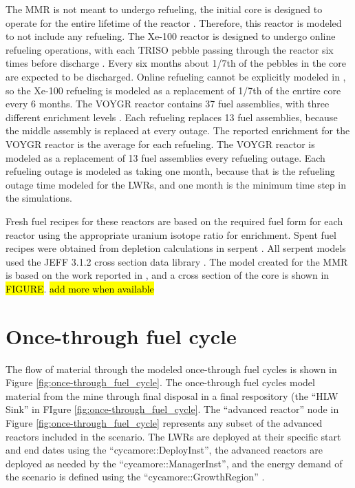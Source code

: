 The \gls{MMR} is not meant to undergo refueling, the initial core is designed 
to operate for the entire lifetime of the reactor \cite{mitchell_usnc_2020}. 
Therefore, this reactor 
is modeled to not include any refueling. The Xe-100 reactor is designed to 
undergo online refueling operations, with each \gls{TRISO} pebble passing 
through the reactor six times before discharge \cite{hussain_advances_2018}. 
Every six months about 1/7th 
of the pebbles in the core are expected to be discharged. Online refueling 
cannot be explicitly modeled in \Cyclus, so the Xe-100 refueling is modeled 
as a replacement of 1/7th of the enrtire core every 6 months. 
The VOYGR reactor contains 37 fuel assemblies, with three different enrichment 
levels \cite{nuscale_chapter_2020}. Each refueling replaces 13 fuel assemblies, 
because the middle assembly is replaced at every outage. The reported enrichment 
for the VOYGR reactor is the average for each refueling. The VOYGR reactor is 
modeled as a replacement of 13 fuel assemblies every refueling outage. Each refueling 
outage is modeled as taking one month, because that is the refueling outage time 
modeled for the \glspl{LWR}, and one month is the minimum time step in the 
simulations. 

Fresh fuel recipes for these reactors are based on the required fuel form for 
each reactor using the appropriate uranium isotope ratio for enrichment. Spent fuel 
recipes were obtained from depletion 
calculations in serpent \cite{leppanen_serpent_2014}. All serpent models used 
the JEFF 3.1.2 cross section data library \cite{koning_status_2011}.
The model created for the \gls{MMR} is based on the work reported in 
\cite{hawari_development_2018}, and a cross section of the core is shown in 
\hl{FIGURE}.  \hl{add more when available}

\section{Once-through fuel cycle}
The flow of material through the modeled once-through fuel cycles is shown 
in Figure \ref{fig:once-through_fuel_cycle}. The once-through fuel cycles model 
material from the mine through final disposal in a final respository (the 
``HLW Sink'' in FIgure \ref{fig:once-through_fuel_cycle}. The ``advanced reactor'' node in Figure 
\ref{fig:once-through_fuel_cycle} represents any subset of the advanced reactors included 
in the scenario. The \glspl{LWR} are deployed at their specific start and end dates 
using the ``cycamore::DeployInst'', the advanced reactors are deployed as needed by 
the ``cycamore::ManagerInst'', and the energy demand of the scenario is defined using 
the ``cycamore::GrowthRegion'' \cite{scopatz_cyclus_2015}.

